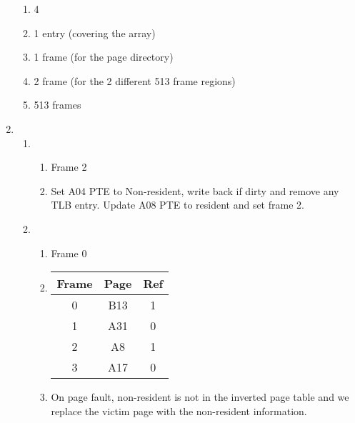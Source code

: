 \documentclass[12pt, a4paper]{article}
\begin{document}
\begin{enumerate}[Q\arabic*.]
\begin{enumerate}[(\alph*.)]
      \item 4

      \item 1 entry (covering the array)

      \item 1 frame (for the page directory)

      \item 2 frame (for the 2 different 513 frame regions)

      \item 513 frames
    \end{enumerate}

  \item 
    \begin{enumerate}[(\alph*.)]
      \item 
        \begin{enumerate}[(\roman*)]
          \item Frame 2

          \item Set A04 PTE to Non-resident, write back if dirty and remove any TLB entry. Update A08 PTE to resident and set frame 2. 
        \end{enumerate}

      \item 
        \begin{enumerate}[(\roman*.)]
          \item Frame 0 

          \item 
            \begin{tabular}{@{}ccc@{}}
              \textbf{Frame} & \textbf{Page} & \textbf{Ref} \\\hline
              0 & B13 & 1 \\
              1 & A31 & 0 \\
              2 & A8  & 1 \\
              3 & A17 & 0 \\
            \end{tabular}

          \item On page fault, non-resident is not in the inverted page table and we replace the victim page with the non-resident information.
        \end{enumerate}
    \end{enumerate}
\end{enumerate}
\end{document}
